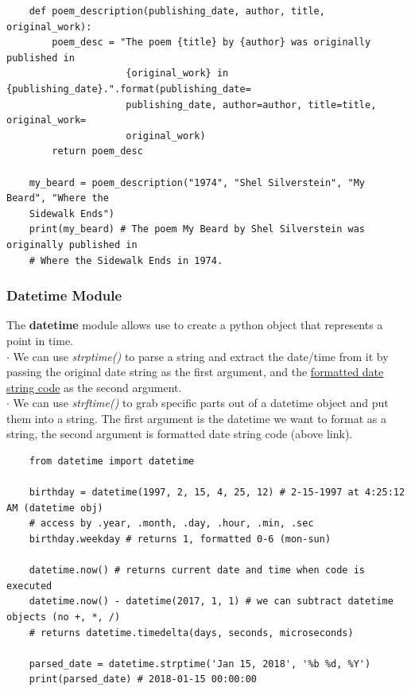\documentclass[11pt, a4paper]{article}
\begin{document}
\begin{spacing}{1.1}
\begin{lstlisting}
	def poem_description(publishing_date, author, title, original_work):
		poem_desc = "The poem {title} by {author} was originally published in 
		             {original_work} in {publishing_date}.".format(publishing_date=
		             publishing_date, author=author, title=title, original_work=
		             original_work)
		return poem_desc
	
	my_beard = poem_description("1974", "Shel Silverstein", "My Beard", "Where the 
	Sidewalk Ends")
	print(my_beard) # The poem My Beard by Shel Silverstein was originally published in 
	# Where the Sidewalk Ends in 1974. \end{lstlisting}\vspace*{4mm}
	
	\subsubsection{Datetime Module}
	The \textbf{datetime} module allows use to create a python object that represents a point in time. \\
	\hspace*{1.5mm} $\cdot$ We can use \textit{strptime()} to parse a string and extract the date/time from it by passing the original date \hspace*{4mm} string as the first argument, and the \href{https://docs.python.org/3/library/datetime.html#strftime-and-strptime-format-codes}{formatted date string code} as the second argument. \\
	\hspace*{1.5mm} $\cdot$ We can use \textit{strftime()} to grab specific parts out of a datetime object and put them into a string. The \hspace*{4mm} first argument is the datetime we want to format as a string, the second argument is formatted date \hspace*{4mm} string code (above link).
	\begin{lstlisting}
	from datetime import datetime
	
	birthday = datetime(1997, 2, 15, 4, 25, 12) # 2-15-1997 at 4:25:12 AM (datetime obj)
	# access by .year, .month, .day, .hour, .min, .sec 
	birthday.weekday # returns 1, formatted 0-6 (mon-sun)
	
	datetime.now() # returns current date and time when code is executed
	datetime.now() - datetime(2017, 1, 1) # we can subtract datetime objects (no +, *, /)
	# returns datetime.timedelta(days, seconds, microseconds)
	
	parsed_date = datetime.strptime('Jan 15, 2018', '%b %d, %Y')
	print(parsed_date) # 2018-01-15 00:00:00
	

\end{lstlisting}
\end{spacing}
\end{document}
